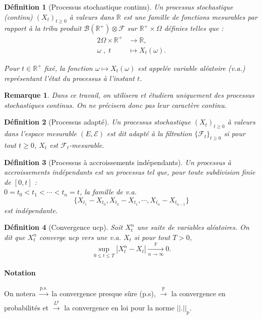 \documentclass[openany]{book}
\newcommand{\F}{\mathscr{F}}
\newcommand{\carE}{\mathscr{E}}
\renewcommand{\P}{\mathds{P}}
\newcommand{\R}{\mathbb{R}}
\newcommand{\1}{\mathbbm{1}}
\theoremstyle{thmfont}
\theoremstyle{deffont}
\newtheorem{definition}[definition]{Définition}
\theoremstyle{thmfont}
\theoremstyle{deffont}
\newtheorem{remark}[remark]{Remarque}
\begin{document}
\begin{definition}[Processus stochastique continu]
  Un \textit{processus stochastique (continu)} $(X_t)_{t \ge 0}$ à valeurs dans $\mathbb{R}$ est une famille de fonctions mesurables par rapport à la tribu produit $\mathcal{B}(\mathbb{R}^+) \otimes \mathcal{F}$ sur $\mathbb{R}^+ \times \Omega$ définies telles que :
  \begin{alignat*}{2}
    \Omega\times \R^+ &\rightarrow \R, \\
    \omega\;,\; t\quad &\mapsto X_t(\omega).
  \end{alignat*}
  
  Pour $t \in \mathbb{R}^+$ fixé, la fonction $\omega \mapsto X_t(\omega)$ est appelée \textit{variable aléatoire} (v.a.) représentant l’état du processus à l’instant $t$.
\end{definition}

\begin{remark} Dans ce travail, on utilisera et étudiera uniquement des processus stochastiques continus. On ne précisera donc pas leur caractère continu.
\end{remark}

\begin{definition}[Processus adapté] Un processus stochastique $(X_t)_{t\ge0}$ à valeurs dans l'espace mesurable $(E, \carE)$ est dit \textit{adapté} à la filtration $\{\F_t\}_{t\geq0}$ si pour tout $t\geq0$, $X_t$ est $\F_t$-mesurable.
\label{def:pr_adapte}
\end{definition}
  

\begin{definition}[Processus à accroissements indépendants]
  \label{def:pr_accr_indep} Un processus à \textit{accroissements indépendants} est un processus tel que, pour toute subdivision finie de $[0,t]$ :\\  $0 = t_0 < t_1 < \cdots < t_n = t$, la famille de v.a.
    $$\{X_{t_1} - X_{t_0}, X_{t_2} - X_{t_1}, \cdots ,X_{t_n} - X_{t_{n-1}}\}$$
    est indépendante.
  \end{definition}

  \begin{definition}[Convergence ucp] Soit $X_t^n$ une suite de variables aléatoires. On dit que $X_t^n$ \textit{converge ucp} vers une v.a. $X_t$ si pour tout $T >0$, 
    $$\underset{0 \leq t \leq T}{\sup}|X_t^n - X_t| \xrightarrow[n \to \infty]{\P} 0.$$
  \end{definition}

  \paragraph{Notation}
  On notera $\xrightarrow[]{\text{p.s.}}$ la convergence presque sûre (p.s), $\xrightarrow[]{\P}$ la convergence en probabilités et $\xrightarrow[]{L^p}$ la convergence en loi pour la norme $||.||_p$.
    
\end{document}
